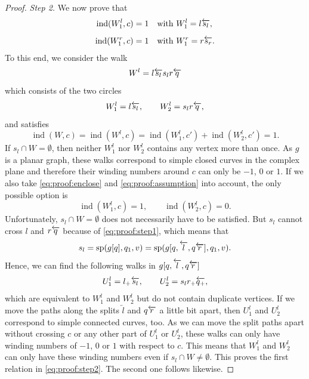 \documentclass[reqno]{amsart}
\let\join\relax
\DeclareMathOperator{\join}{\dot{+}}
\DeclareMathOperator{\ind}{ind}
\DeclareMathOperator{\spa}{sp}
\begin{document}
\begin{proof}
\emph{Step 2.} We now prove that 
\begin{equation}\label{eq:proof:step2}
	\begin{aligned}
		\ind(W^l_1,c) &= 1 \quad \text{with } W^l_1 = l \join \overleftarrow{s_l},\\*[2mm]
		\ind(W^r_1,c) &= 1 \quad \text{with } W^r_1 = r \join \overleftarrow{s_r}.
	\end{aligned}
\end{equation}
To this end, we consider the walk  
\begin{equation*}
	W^l = l \join \overleftarrow{s_l} \join s_l \join r \join \overleftarrow{q}
\end{equation*}
which consists of the two circles
\[
	W^l_1 = l \join \overleftarrow{s_l}, \qquad
	W^l_2 = s_l \join r \join \overleftarrow{q},
\]
and satisfies
\begin{equation}\label{eq:proof:enclose}
	\ind(W,c) = \ind(W^l,c) = \ind(W^l_1,c') + \ind(W^l_2,c') = 1.
\end{equation}
If $s_l \cap W = \emptyset$, then neither $W^l_1$ nor $W^l_2$ contains any vertex more than once. As $g$ is a planar graph, these walks correspond to simple closed curves in the complex plane and therefore their winding numbers around $c$ can only be $-1$, $0$ or $1$. If we also take \eqref{eq:proof:enclose} and \eqref{eq:proof:assumption} into account, the only possible option is 
\[
	\ind(W^l_1,c) = 1, \qquad
	\ind(W^l_2,c) = 0.
\]
Unfortunately, $s_l \cap W = \emptyset$ does not necessarily have to be satisfied. But $s_l$ cannot cross $l$ and $r \join \overleftarrow{q}$ because of \eqref{eq:proof:step1}, which means that $$s_l = \spa(g[q],q_1,v) = \spa(g[q,\overleftarrow{l},q\join\overleftarrow{r}],q_1,v).$$ Hence, we can find the following walks in $g[q,\overleftarrow{l},q\join\overleftarrow{r}]$
\begin{equation*}
		U^l_1 = l_+ \join \overleftarrow{s_l}, \qquad
		U^l_2 = s_l \join r_+ \join \overleftarrow{q_+},
\end{equation*}
which are equivalent to $W^l_1$ and $W^l_2$ but do not contain duplicate vertices. If we move the paths along the splits $\overleftarrow{l}$ and $q\join\overleftarrow{r}$ a little bit apart, then $U^l_1$ and $U^l_2$ correspond to simple connected curves, too. As we can move the split paths apart without crossing $c$ or any other part of $U^l_1$ or $U^l_2$, these walks can only have winding numbers of $-1$, $0$ or $1$ with respect to $c$. This means that $W^l_1$ and $W^l_2$ can only have these winding numbers even if $s_l \cap W \ne \emptyset$. This proves the first relation in \eqref{eq:proof:step2}. The second one follows likewise.


\end{proof}
\end{document}
